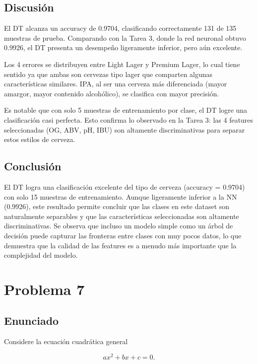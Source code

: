 \documentclass{article}
\begin{document}
\subsection{Discusión}

El DT alcanza un accuracy de 0.9704, clasificando correctamente 131 de 135 muestras de prueba. Comparando con la Tarea 3, donde la red neuronal obtuvo 0.9926, el DT presenta un desempeño ligeramente inferior, pero aún excelente.

Los 4 errores se distribuyen entre Light Lager y Premium Lager, lo cual tiene sentido ya que ambas son cervezas tipo lager que comparten algunas características similares. IPA, al ser una cerveza más diferenciada (mayor amargor, mayor contenido alcohólico), se clasifica con mayor precisión.

Es notable que con solo 5 muestras de entrenamiento por clase, el DT logre una clasificación casi perfecta. Esto confirma lo observado en la Tarea 3: las 4 features seleccionadas (OG, ABV, pH, IBU) son altamente discriminativas para separar estos estilos de cerveza.

\subsection{Conclusión}

El DT logra una clasificación excelente del tipo de cerveza (accuracy = 0.9704) con solo 15 muestras de entrenamiento. Aunque ligeramente inferior a la NN (0.9926), este resultado permite concluir que las clases en este dataset son naturalmente separables y que las características seleccionadas son altamente discriminativas. Se observa que incluso un modelo simple como un árbol de decisión puede capturar las fronteras entre clases con muy pocos datos, lo que demuestra que la calidad de las features es a menudo más importante que la complejidad del modelo.

\section{Problema 7}

\subsection{Enunciado}

Considere la ecuación cuadrática general

\[
ax^{2} + bx + c = 0.
\]
\end{document}

